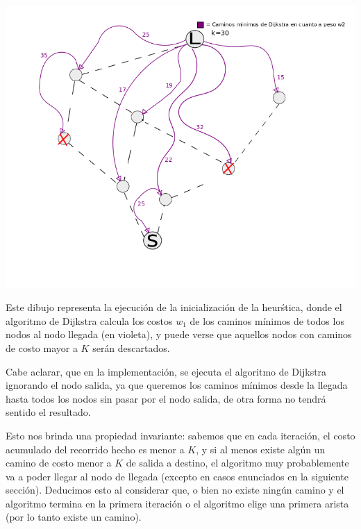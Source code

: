 \begin{center}
\includegraphics[scale=0.58]{img/inicializacion.png}
\end{center}
\vspace{2mm}

Este dibujo representa la ejecuci\'on de la inicializaci\'on de la heur\'stica, donde el algoritmo de Dijkstra calcula los costos $w_1$ de los caminos m\'inimos de todos los nodos al nodo llegada (en violeta), y puede verse que aquellos nodos con caminos de costo mayor a $K$ ser\'an descartados.

\vspace{2mm}

Cabe aclarar, que en la implementaci\'on, se ejecuta el algoritmo de Dijkstra ignorando el nodo salida, ya que queremos los caminos m\'inimos desde la llegada hasta todos los nodos sin pasar por el nodo salida, de otra forma no tendr\'a sentido el resultado.

\vspace{2mm}

Esto nos brinda una propiedad invariante: sabemos que en cada iteraci\'on, el costo acumulado del recorrido hecho es menor a $K$, y si al menos existe alg\'un un camino de costo menor a $K$ de salida a destino, el algoritmo muy probablemente va a poder llegar al nodo de llegada (excepto en casos enunciados en la siguiente secci\'on). Deducimos esto al considerar que, o bien no existe ning\'un camino y  el algoritmo termina en la primera iteraci\'on o el algoritmo elige una primera arista (por lo tanto existe un camino). 

